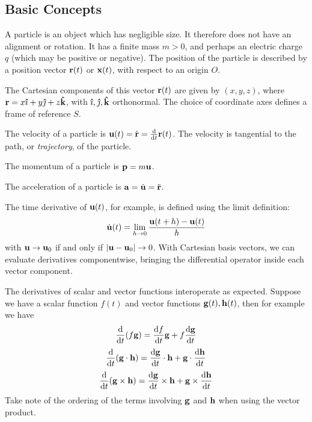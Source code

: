 \subsection{Basic Concepts}
\begin{definition}
	A particle is an object which has negligible size.
	It therefore does not have an alignment or rotation.
	It has a finite mass \(m > 0\), and perhaps an electric charge \(q\) (which may be positive or negative).
	The position of the particle is described by a position vector \(\vb r(t)\) or \(\vb x(t)\), with respect to an origin \(O\).
\end{definition}
\begin{definition}
	The Cartesian components of this vector \(\vb r(t)\) are given by \((x, y, z)\), where \(\vb r = x \vu{\imath} + y \vu{\jmath} + z \vu{k}\), with \(\vu{\imath}, \vu{\jmath}, \vu{k}\) orthonormal.
	The choice of coordinate axes defines a frame of reference \(S\).
\end{definition}
\begin{definition}
	The velocity of a particle is \(\vb u(t) = \dot{\vb r} = \frac{\dd}{\dd{t}}\vb r(t)\).
	The velocity is tangential to the path, or \textit{trajectory}, of the particle.
\end{definition}
\begin{definition}
	The momentum of a particle is \(\vb p = m \vb u\).
\end{definition}
\begin{definition}
	The acceleration of a particle is \(\vb a = \dot{\vb u} = \ddot{\vb r}\).
\end{definition}
\begin{note}
	The time derivative of \(\vb u(t)\), for example, is defined using the limit definition:
	\[
		\dot{\vb u}(t) = \lim_{h \to 0} \frac{\vb u(t + h) - \vb u(t)}{h}
	\]
	with \(\vb u \to \vb u_0\) if and only if \(\abs{\vb u - \vb u_0} \to 0\).
	With Cartesian basis vectors, we can evaluate derivatives componentwise, bringing the differential operator inside each vector component.
\end{note}
The derivatives of scalar and vector functions interoperate as expected.
Suppose we have a scalar function \(f(t)\) and vector functions \(\vb g(t), \vb h(t)\), then for example we have
\[
	\frac{\dd}{\dd{t}}(f \vb g) = \frac{\dd{f}}{\dd{t}} \vb g + f \frac{\dd \vb g}{\dd{t}}
\]
\[
	\frac{\dd}{\dd{t}}(\vb g \cdot \vb h) = \frac{\dd \vb g}{\dd{t}}\cdot \vb h + \vb g \cdot \frac{\dd \vb h}{\dd{t}}
\]
\[
	\frac{\dd}{\dd{t}}(\vb g \times \vb h) = \frac{\dd \vb g}{\dd{t}}\times \vb h + \vb g \times \frac{\dd \vb h}{\dd{t}}
\]
Take note of the ordering of the terms involving \(\vb g\) and \(\vb h\) when using the vector product.

